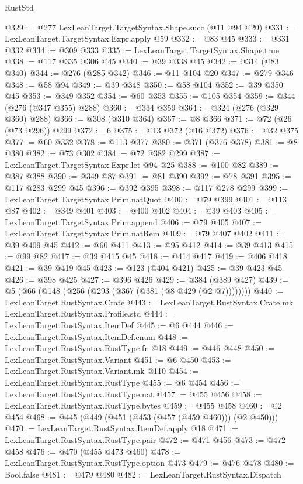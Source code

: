 \begin{lexlean}{RustStd}
\begin{coremodule}
@329 := @277 LexLeanTarget.TargetSyntax.Shape.succ (@11 @94 @20)
@331 := LexLeanTarget.TargetSyntax.Expr.apply @59
@332 := @83 @45
@333 := @331 @332
@334 := @309 @333
@335 := LexLeanTarget.TargetSyntax.Shape.true
@338 := @117 @335 @306 @45
@340 := @39 @338 @45
@342 := @314 (@83 @340)
@344 := @276 (@285 @342)
@346 := @11 @104 @20
@347 := @279 @346
@348 := @58 @94
@349 := @39 @348
@350 := @58 @104
@352 := @39 @350 @45
@353 := @349 @352
@354 := @60 @353
@355 := @105 @354
@359 := @344 (@276 (@347 @355) @288)
@360 := @334 @359
@364 := @324 (@276 (@329 @360) @288)
@366 := @308 (@310 @364)
@367 := @8 @366
@371 := @72 (@26 (@73 @296)) @299
@372 := 6
@375 := @13 @372 (@16 @372)
@376 := @32 @375
@377 := @60 @332
@378 := @113 @377
@380 := @371 (@376 @378)
@381 := @8 @380
@382 := @73 @302
@384 := @72 @382 @299
@387 := LexLeanTarget.TargetSyntax.Expr.let @94 @25
@388 := @100 @82
@389 := @387 @388
@390 := @349 @87
@391 := @81 @390
@392 := @78 @391
@395 := @117 @283 @299 @45
@396 := @392 @395
@398 := @117 @278 @299
@399 := LexLeanTarget.TargetSyntax.Prim.natQuot
@400 := @79 @399
@401 := @113 @87
@402 := @349 @401
@403 := @400 @402
@404 := @39 @403
@405 := LexLeanTarget.TargetSyntax.Prim.append
@406 := @79 @405
@407 := LexLeanTarget.TargetSyntax.Prim.natRem
@409 := @79 @407 @402
@411 := @39 @409 @45
@412 := @60 @411
@413 := @95 @412
@414 := @39 @413
@415 := @99 @82
@417 := @39 @415 @45
@418 := @414 @417
@419 := @406 @418
@421 := @39 @419 @45
@423 := @123 (@404 @421)
@425 := @39 @423 @45
@426 := @398 @425
@427 := @396 @426
@429 := @384 (@389 @427)
@439 := @5 (@66 (@148 (@256 (@293 (@367 (@381 (@8 @429 (@2 @7))))))))
@440 := LexLeanTarget.RustSyntax.Crate
@443 := LexLeanTarget.RustSyntax.Crate.mk LexLeanTarget.RustSyntax.Profile.std
@444 := LexLeanTarget.RustSyntax.ItemDef
@445 := @6 @444
@446 := LexLeanTarget.RustSyntax.ItemDef.enum
@448 := LexLeanTarget.RustSyntax.RustType.fn @18
@449 := @446 @448
@450 := LexLeanTarget.RustSyntax.Variant
@451 := @6 @450
@453 := LexLeanTarget.RustSyntax.Variant.mk @110
@454 := LexLeanTarget.RustSyntax.RustType
@455 := @6 @454
@456 := LexLeanTarget.RustSyntax.RustType.nat
@457 := @455 @456
@458 := LexLeanTarget.RustSyntax.RustType.bytes
@459 := @455 @458
@460 := @2 @454
@468 := @445 (@449 (@451 (@453 (@457 (@459 @460))) (@2 @450)))
@470 := LexLeanTarget.RustSyntax.ItemDef.apply @18
@471 := LexLeanTarget.RustSyntax.RustType.pair
@472 := @471 @456
@473 := @472 @458
@476 := @470 (@455 @473 @460)
@478 := LexLeanTarget.RustSyntax.RustType.option @473
@479 := @476 @478
@480 := Bool.false
@481 := @479 @480
@482 := LexLeanTarget.RustSyntax.Dispatch

\end{coremodule}
\end{lexlean}
